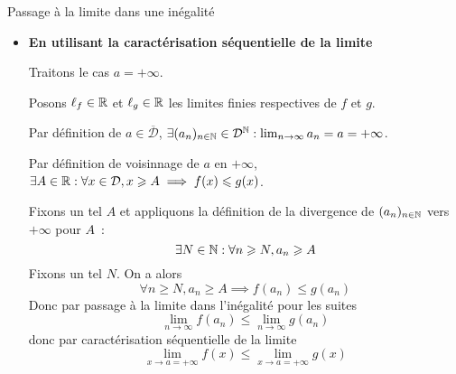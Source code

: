 \documentclass{article}
\begin{document}
{Passage à la limite dans une inégalité}
	\hfill\\
	\begin{itemize}[label=$\star$]
		\item \textbf{En utilisant la caractérisation séquentielle de la limite}

		      Traitons le cas $a = +\infty$.

		      Posons $\ell_{f} \in\mathbb R$ et $\ell_{g} \in \mathbb R$ les limites finies respectives de $f$ et $g$.

		      Par définition de $a \in \overline{\mathcal{D}}$, $\exists (a_{n})_{n \in \mathbb N} \in \mathcal{D}^{\mathbb N} : \lim_{ n \to \infty }a_{n} = a = +\infty$.

		      Par définition de voisinnage de $a$ en $+\infty$, $\exists A \in \mathbb R : \forall x \in \mathcal{D}, x\geqslant A \implies f(x) \leqslant g(x)$.

		      Fixons un tel $A$ et appliquons la définition de la divergence de $(a_{n})_{n \in \mathbb N}$ vers $+\infty$ pour $A$~:
		      $$
			      \exists N \in \mathbb N : \forall n \geqslant N, a_{n} \geqslant A
		      $$
		      Fixons un tel $N$. On a alors
		      $$
			      \forall n \geqslant N, a_{n} \geqslant A \implies f(a_{n}) \leqslant g(a_{n})
		      $$
		      Donc par passage à la limite dans l'inégalité pour les suites
		      $$
			      \lim_{ n \to \infty } f(a_{n}) \leqslant \lim_{ n \to \infty } g(a_{n})
		      $$
		      donc par caractérisation séquentielle de la limite
		      $$
			      \lim_{ x \to a=+\infty}  f(x) \leqslant \lim_{ x \to a  = +\infty} g(x)
		      $$


\end{itemize}
\end{question_kholle}
\end{document}
